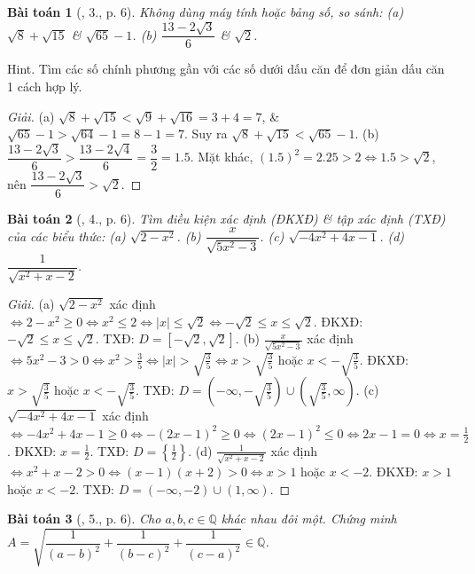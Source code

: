 \documentclass{article}
\newtheorem{baitoan}{Bài toán}
\begin{document}
\begin{baitoan}[\cite{Tuyen_Toan_9}, 3., p. 6]
	Không dùng máy tính hoặc bảng số, so sánh: (a) $\sqrt{8} + \sqrt{15}$ \& $\sqrt{65} - 1$. (b) $\dfrac{13 - 2\sqrt{3}}{6}$ \& $\sqrt{2}$.
\end{baitoan}
\noindent\textsf{Hint.} Tìm các số chính phương gần với các số dưới dấu căn để đơn giản dấu căn 1 cách hợp lý. 

\begin{proof}[Giải]
	(a) $\sqrt{8} + \sqrt{15} < \sqrt{9} + \sqrt{16} = 3 + 4 = 7$, \& $\sqrt{65} - 1 > \sqrt{64} - 1 = 8 - 1 = 7$. Suy ra $\sqrt{8} + \sqrt{15} < \sqrt{65} - 1$. (b) $\dfrac{13 - 2\sqrt{3}}{6} > \dfrac{13 - 2\sqrt{4}}{6} = \dfrac{3}{2} = 1.5$. Mặt khác, $(1.5)^2 = 2.25 > 2\Leftrightarrow 1.5 > \sqrt{2}$, nên $\dfrac{13 - 2\sqrt{3}}{6} > \sqrt{2}$.
\end{proof}

\begin{baitoan}[\cite{Tuyen_Toan_9}, 4., p. 6]
	Tìm điều kiện xác định (ĐKXĐ) \& tập xác định (TXĐ) của các biểu thức: (a) $\sqrt{2 - x^2}$. (b) $\dfrac{x}{\sqrt{5x^2 - 3}}$. (c) $\sqrt{-4x^2 + 4x - 1}$. (d) $\dfrac{1}{\sqrt{x^2 + x - 2}}$.
\end{baitoan}

\begin{proof}[Giải]
	(a) $\sqrt{2 - x^2}$ xác định $\Leftrightarrow2 - x^2\ge0\Leftrightarrow x^2\le2\Leftrightarrow|x|\le\sqrt{2}\Leftrightarrow-\sqrt{2}\le x\le\sqrt{2}$. ĐKXĐ: $-\sqrt{2}\le x\le\sqrt{2}$. TXĐ: $D = [-\sqrt{2},\sqrt{2}]$. (b) $\frac{x}{\sqrt{5x^2 - 3}}$ xác định $\Leftrightarrow 5x^2 - 3 > 0\Leftrightarrow x^2 > \frac{3}{5}\Leftrightarrow|x| > \sqrt{\frac{3}{5}}\Leftrightarrow x > \sqrt{\frac{3}{5}}$ hoặc $x < -\sqrt{\frac{3}{5}}$. ĐKXĐ: $x > \sqrt{\frac{3}{5}}$ hoặc $x < -\sqrt{\frac{3}{5}}$. TXĐ: $D = \left(-\infty,-\sqrt{\frac{3}{5}}\right)\cup\left(\sqrt{\frac{3}{5}},\infty\right)$. (c) $\sqrt{-4x^2 + 4x - 1}$ xác định $\Leftrightarrow-4x^2 + 4x - 1\ge0\Leftrightarrow-(2x - 1)^2\ge0\Leftrightarrow(2x - 1)^2\le0\Leftrightarrow2x - 1 = 0\Leftrightarrow x = \frac{1}{2}$. ĐKXĐ: $x = \frac{1}{2}$. TXĐ: $D = \left\{\frac{1}{2}\right\}$. (d) $\frac{1}{\sqrt{x^2 + x - 2}}$ xác định $\Leftrightarrow x^2 + x - 2 > 0\Leftrightarrow(x - 1)(x + 2) > 0\Leftrightarrow x > 1$ hoặc $x < -2$. ĐKXĐ: $x > 1$ hoặc $x < -2$. TXĐ: $D = (-\infty,-2)\cup(1,\infty)$.
\end{proof}

\begin{baitoan}[\cite{Tuyen_Toan_9}, 5., p. 6]
	Cho $a,b,c\in\mathbb{Q}$ khác nhau đôi một. Chứng minh $A = \sqrt{\dfrac{1}{(a - b)^2} + \dfrac{1}{(b - c)^2} + \dfrac{1}{(c - a)^2}}\in\mathbb{Q}$.
\end{baitoan}
\end{document}
